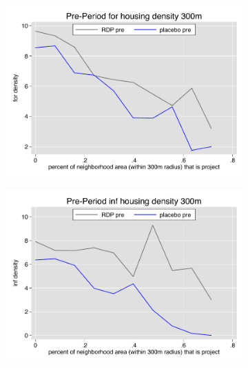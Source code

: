 \documentclass[12pt]{article}
\begin{document}
\begin{figure}
        \begin{subfigure}[b]{0.495\textwidth}
            \centering
            \includegraphics[width=\textwidth,trim={0.3cm .3cm 0.1cm 0cm}, clip=true]{figures/overlap_for_300_local_pre.pdf}
        \end{subfigure}
        \hfill
        \begin{subfigure}[b]{0.495\textwidth}  
            \centering 
            \includegraphics[width=\textwidth,trim={0.3cm .3cm 0.1cm 0cm}, clip=true]{figures/overlap_inf_300_local_pre.pdf}
        \end{subfigure}
        \vspace{-6mm}

\end{figure}
\end{document}
